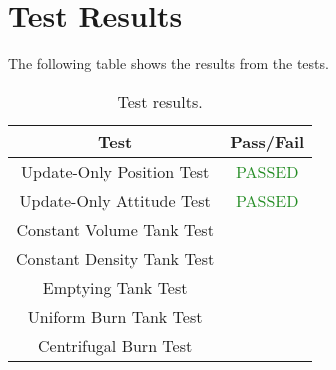 \section{Test Results}

The following table shows the results from the tests.

\begin{table}[H]
	\caption{Test results.}
	\label{tab:results}
	\centering \fontsize{10}{10}\selectfont
	\begin{tabular}{c | c } %
		\hline
		\textbf{Test} 				    & \textbf{Pass/Fail}  \\ \hline
		Update-Only Position Test  & \textcolor{ForestGreen}{PASSED}\\
		Update-Only Attitude Test  & \textcolor{ForestGreen}{PASSED}   \\ 
		Constant Volume Tank Test  &   \\ 
		Constant Density Tank Test &   \\ 
		Emptying Tank Test &   \\ 
		Uniform Burn Tank Test  &   \\ 
		Centrifugal Burn Test &   \\ \hline
	\end{tabular}
\end{table}